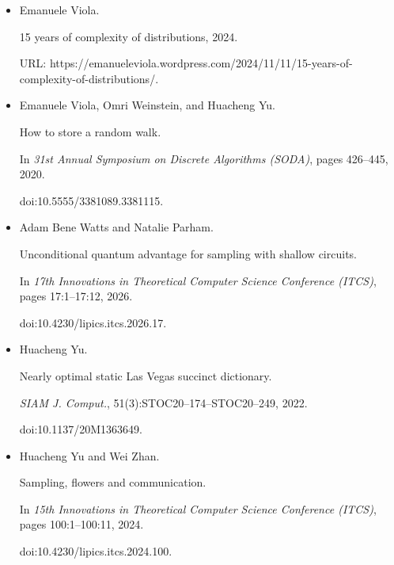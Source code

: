 \begin{itemize}
doi:10.4230/lipics.ccc.2023.26.





\item[] 
[46]

Emanuele Viola.


15 years of complexity of distributions, 2024.


URL:
https://emanueleviola.wordpress.com/2024/11/11/15-years-of-complexity-of-distributions/.





\item[] 
[47]

Emanuele Viola, Omri Weinstein, and Huacheng Yu.


How to store a random walk.


In \emph{31st Annual Symposium on Discrete Algorithms (SODA)}, pages
426–445, 2020.


doi:10.5555/3381089.3381115.





\item[] 
[48]

Adam Bene Watts and Natalie Parham.


Unconditional quantum advantage for sampling with shallow circuits.


In \emph{17th Innovations in Theoretical Computer Science Conference
(ITCS)}, pages 17:1–17:12, 2026.


doi:10.4230/lipics.itcs.2026.17.





\item[] 
[49]

Huacheng Yu.


Nearly optimal static Las Vegas succinct dictionary.


\emph{SIAM J. Comput.}, 51(3):STOC20–174–STOC20–249, 2022.


doi:10.1137/20M1363649.





\item[] 
[50]

Huacheng Yu and Wei Zhan.


Sampling, flowers and communication.


In \emph{15th Innovations in Theoretical Computer Science Conference
(ITCS)}, pages 100:1–100:11, 2024.


doi:10.4230/lipics.itcs.2024.100.





\end{itemize}


